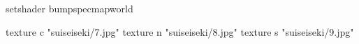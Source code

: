 setshader bumpspecmapworld

    texture c "suiseiseki/7.jpg"
    texture n "suiseiseki/8.jpg"
    texture s "suiseiseki/9.jpg"
